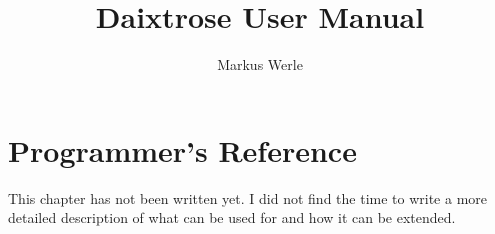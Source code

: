 \documentclass[11pt,twoside,a4paper]{article}
\begin{document}
\author{Markus Werle}
\title{Daixtrose User Manual}

\thispagestyle{empty}

\maketitle

\thispagestyle{empty}


\tableofcontents




\pagestyle{fancy}


%




\section{Programmer's Reference}
\label{sec: Programmer's Reference}

This chapter has not been written yet.
I did not find the time to write a more detailed
description of what \Daixtrose can be used for and how it can be extended.
\end{document}
